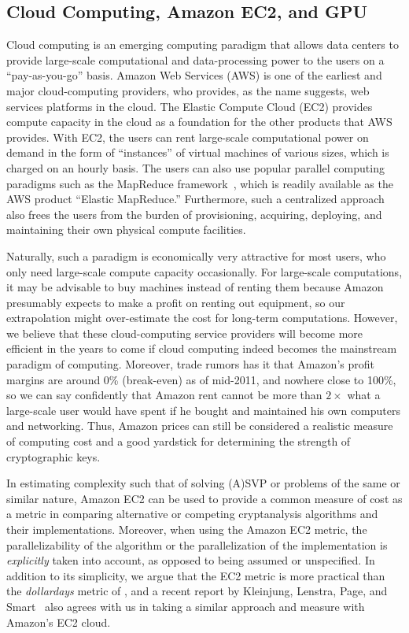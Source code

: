 \begin{CJK}{Bg5}{bsmi}
\section{Cloud Computing, Amazon EC2, and GPU}

Cloud computing is an emerging computing paradigm that allows data
centers to provide large-scale computational and data-processing power
to the users on a ``pay-as-you-go'' basis.
%
Amazon Web Services (AWS) is one of the earliest and major
cloud-computing providers, who provides, as the name suggests, web
services platforms in the cloud.
%
The Elastic Compute Cloud (EC2) provides compute capacity in the cloud
as a foundation for the other products that AWS provides.
%
With EC2, the users can rent large-scale computational power on demand
in the form of ``instances'' of virtual machines of various sizes,
which is charged on an hourly basis.
%
The users can also use popular parallel computing paradigms such as
the MapReduce framework~\cite{Dean2004MapReduce}, which is readily
available as the AWS product ``Elastic MapReduce.''
%
Furthermore, such a centralized approach also frees the users from the
burden of provisioning, acquiring, deploying, and maintaining their
own physical compute facilities.

Naturally, such a paradigm is economically very attractive for most
users, who only need large-scale compute capacity occasionally.
For large-scale computations, it may be advisable to buy machines
instead of renting them because Amazon presumably expects to make a
profit on renting out equipment, so our extrapolation might
over-estimate the cost for long-term computations.  
%
However, we believe that these cloud-computing service providers will
become more efficient in the years to come if cloud computing indeed
becomes the mainstream paradigm of computing.
%
Moreover, trade
rumors has it that Amazon's profit margins are around 0\% (break-even)
as of mid-2011, and nowhere close to 100\%, so we can say confidently
that Amazon rent cannot be more than $2\times$ what a
large-scale user would have spent if he bought and maintained his own
computers and networking.  Thus, Amazon prices can still be considered
a realistic measure of computing cost and a good yardstick for
determining the strength of cryptographic keys.


In estimating complexity such that of solving (A)SVP or problems of
the same or similar nature, Amazon EC2 can be used to provide a common
measure of cost as a metric in comparing alternative or competing
cryptanalysis algorithms and their implementations.
%
Moreover, when using the Amazon EC2 metric, the parallelizability of
the algorithm or the parallelization of the implementation
is \emph{explicitly} taken into account, as opposed to being assumed
or unspecified.
%
In addition to its simplicity, we argue that the EC2 metric is more
practical than the \emph{dollardays}
metric of \cite{Lenstra2004KeyLength}, and a recent report by
Kleinjung, Lenstra, Page, and Smart~\cite{KleinjungLPS11} also agrees with us in taking a
similar approach and measure with Amazon's EC2 cloud.



\end{CJK}
